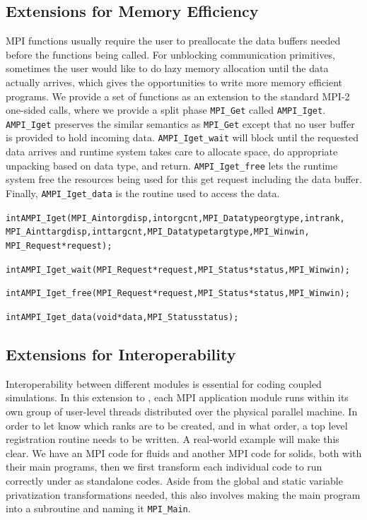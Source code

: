 \documentclass[10pt]{article}
\begin{document}
\subsection{Extensions for Memory Efficiency}

MPI functions usually require the user to preallocate the data buffers needed before the
functions being called. For unblocking communication primitives, sometimes the user would
like to do lazy memory allocation until the data actually arrives, which gives the
opportunities to write more memory efficient programs.
We provide a set of \ampi{} functions as an extension to the standard MPI-2 one-sided calls,
where we provide a split phase \texttt{MPI\_Get} called \texttt{AMPI\_Iget}. \texttt{AMPI\_Iget} preserves the similar
semantics as \texttt{MPI\_Get} except that no user buffer is provided to hold incoming data.
\texttt{AMPI\_Iget\_wait} will block until the requested data arrives and runtime system takes
care to allocate space, do appropriate unpacking based on data type, and return.
\texttt{AMPI\_Iget\_free} lets the runtime system free the resources being used for this get request
including the data buffer. Finally, \texttt{AMPI\_Iget\_data} is the routine used to access the data.
 

\begin{alltt}

int AMPI_Iget(MPI_Aint orgdisp, int orgcnt, MPI_Datatype orgtype, int rank,
              MPI_Aint targdisp, int targcnt, MPI_Datatype targtype, MPI_Win win,
              MPI_Request *request);

int AMPI_Iget_wait(MPI_Request *request, MPI_Status *status, MPI_Win win);

int AMPI_Iget_free(MPI_Request *request, MPI_Status *status, MPI_Win win);

int AMPI_Iget_data(void *data, MPI_Status status);

\end{alltt}



\subsection{Extensions for Interoperability}

Interoperability between different modules is essential for coding coupled
simulations.  In this extension to \ampi{}, each MPI application module runs
within its own group of user-level threads distributed over the physical
parallel machine.  In order to let \ampi{} know which ranks are to be created,
and in what order, a top level registration routine needs to be written. A
real-world example will make this clear. We have an MPI code for fluids and
another MPI code for solids, both with their main programs, then we first
transform each individual code to run correctly under \ampi{} as standalone
codes. Aside from the global and static variable privatization transformations
needed, this also involves making the main program into a subroutine and
naming it \texttt{MPI\_Main}.
\end{document}
